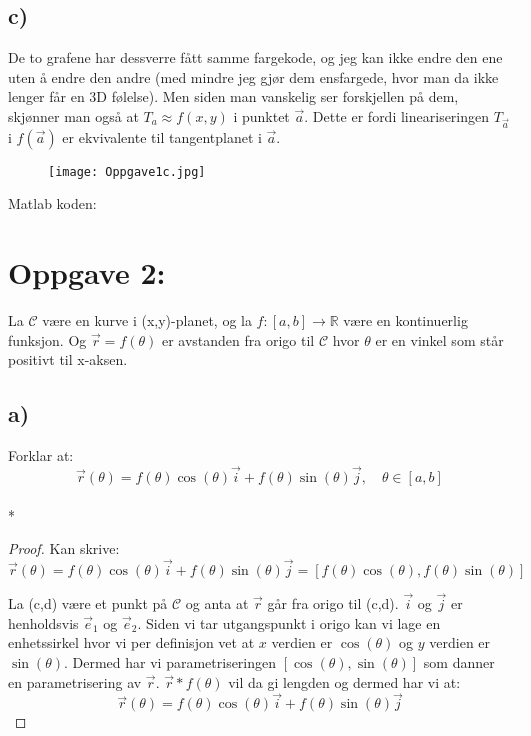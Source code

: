 \documentclass[a4paper, norsk, twoside, 10pt]{article}
\begin{document}
    \subsection*{c)}
        De to grafene har dessverre fått samme fargekode, og jeg kan ikke endre den ene uten å endre den andre (med mindre jeg gjør dem ensfargede, hvor man da ikke lenger får en 3D følelse). Men siden man vanskelig ser forskjellen på dem, skjønner man også at $T_{a} \approx f(x,y)$ i punktet $\vec{a}$. Dette er fordi lineariseringen $T_{\vec{a}}$ i $f(\vec{a})$ er ekvivalente til tangentplanet i $\vec{a}$.
    \begin{figure}[H]
    \begin{center}
    \texttt{[image: Oppgave1c.jpg]}
    \end{center}
    \end{figure}
    Matlab koden:
        

  \section*{Oppgave 2:}
  La $\mathcal{C}$ være en kurve i (x,y)-planet, og la $f: [a,b] \rightarrow \mathbb{R}$ være en kontinuerlig funksjon. Og $\vec{r}=f(\theta)$ er avstanden fra origo til $\mathcal{C}$ hvor $\theta$ er en vinkel som står positivt til x-aksen.

  \subsection*{a)}
  Forklar at: \[\vec{r}(\theta) = f(\theta)\cos(\theta)\vec{i} + f(\theta)\sin(\theta)\vec{j}, \quad \theta \in [a,b]\]\\*

  \begin{proof}
    Kan skrive: \[\vec{r}(\theta) = f(\theta)\cos(\theta)\vec{i} + f(\theta)\sin(\theta)\vec{j} = [f(\theta)\cos(\theta), f(\theta)\sin(\theta)]\]
    
    La (c,d) være et punkt på $\mathcal{C}$ og anta at $\vec{r}$ går fra origo til (c,d). $\vec{i}$ og $\vec{j}$ er henholdsvis $\vec{e}_{1}$ og $\vec{e}_{2}$. Siden vi tar utgangspunkt i origo kan vi lage en enhetssirkel hvor vi per definisjon vet at $x$ verdien er $\cos(\theta)$ og $y$ verdien er $\sin(\theta)$. Dermed har vi parametriseringen $[\cos(\theta), \sin(\theta)]$ som danner en parametrisering av $\vec{r}$. $\vec{r} * f(\theta)$ vil da gi lengden og dermed har vi at: \[\vec{r}(\theta) = f(\theta)\cos(\theta)\vec{i} + f(\theta)\sin(\theta)\vec{j}\]
    
  \end{proof}
\end{document}
